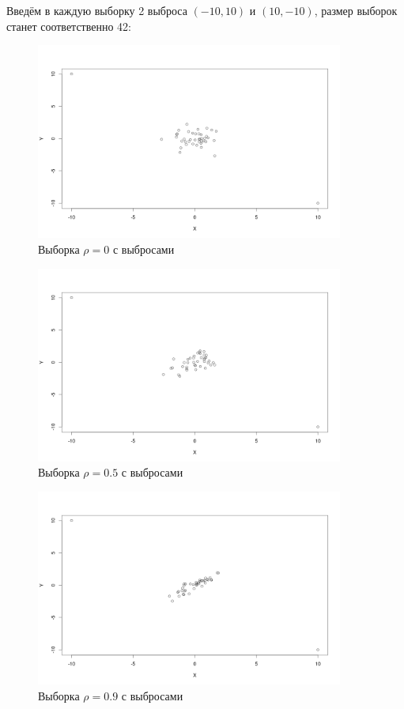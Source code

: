 \documentclass{article} %
\begin{document}
\newpage
Введём в каждую выборку 2 выброса $(-10,10)$ и $(10, -10)$, размер выборок станет соответственно 42:

\begin{figure}[H]
    \captionsetup{justification=centering}
    \includegraphics[width=0.9\textwidth]{plot0e}
    \caption{Выборка $\rho = 0$ с выбросами}
\end{figure}

\begin{figure}[H]
    \captionsetup{justification=centering}
    \includegraphics[width=0.9\textwidth]{plot05e}
    \caption{Выборка $\rho = 0.5$ с выбросами}
\end{figure}

\begin{figure}[H]
    \captionsetup{justification=centering}
    \includegraphics[width=0.9\textwidth]{plot09e}
    \caption{Выборка $\rho = 0.9$ с выбросами}
\end{figure}
\end{document}
